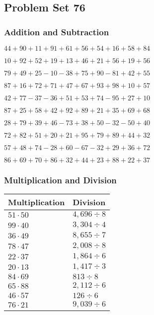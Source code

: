 \hypertarget{problem-set-76}{%
\subsection{Problem Set 76}\label{problem-set-76}}

\hypertarget{addition-and-subtraction}{%
\subsubsection{Addition and
Subtraction}\label{addition-and-subtraction}}

\(44+90+11+91+61+56+54+16+58+84\)

\(10+92+52+19+13+46+21+56+19+56\)

\(79+49+25-10-38+75+90-81+42+55\)

\(87+16+72+71+47+67+93+98+10+57\)

\(42+77-37-36+51+53+74-95+27+10\)

\(87+25+58+42+92+89+21+35+69+68\)

\(28+79+39+46-73+38+50-32-50+40\)

\(72+82+51+20+21+95+79+89+44+32\)

\(57+48+74-28+60-67-32+29+36+72\)

\(86+69+70+86+32+44+23+88+22+37\)

\hypertarget{multiplication-and-division}{%
\subsubsection{Multiplication and
Division}\label{multiplication-and-division}}

\begin{longtable}[]{@{}ll@{}}
\toprule
Multiplication & Division\tabularnewline
\midrule
\endhead
\(51\cdot50\) & \(4,696÷8\)\tabularnewline
\(99\cdot40\) & \(3,304÷4\)\tabularnewline
\(36\cdot49\) & \(8,655÷7\)\tabularnewline
\(78\cdot47\) & \(2,008÷8\)\tabularnewline
\(22\cdot37\) & \(1,864÷6\)\tabularnewline
\(20\cdot13\) & \(1,417÷3\)\tabularnewline
\(84\cdot69\) & \(813÷8\)\tabularnewline
\(65\cdot88\) & \(2,112 ÷6\)\tabularnewline
\(46\cdot57\) & \(126÷6\)\tabularnewline
\(76\cdot21\) & \(9,039÷6\)\tabularnewline
\bottomrule
\end{longtable}

